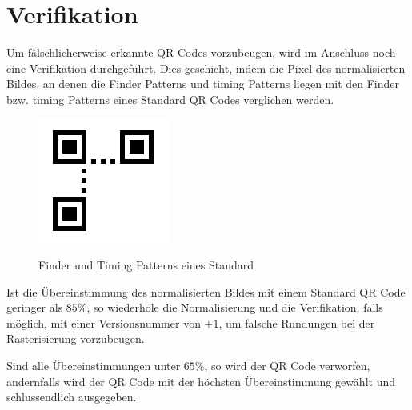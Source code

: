 \section{Verifikation}
Um fälschlicherweise erkannte QR Codes vorzubeugen, wird im Anschluss noch eine Verifikation durchgeführt. Dies geschieht, indem die Pixel des normalisierten Bildes, an denen die Finder Patterns und timing Patterns liegen mit den Finder bzw. timing Patterns eines Standard QR Codes verglichen werden.
\begin{figure}[h]
\centering
\includegraphics[scale=0.5]{images/verifikation.png}
\label{fig:version-qrcode}\caption{Finder und Timing Patterns eines Standard \QRCode}
\end{figure}

Ist die Übereinstimmung des normalisierten Bildes mit einem Standard QR Code geringer als $85\%$, so wiederhole die Normalisierung und die Verifikation, falls möglich, mit einer Versionsnummer von $\pm 1$, um falsche Rundungen bei der Rasterisierung vorzubeugen.

Sind alle Übereinstimmungen unter $65\%$, so wird der QR Code verworfen, andernfalls wird der QR Code mit der höchsten Übereinstimmung gewählt und schlussendlich ausgegeben.
